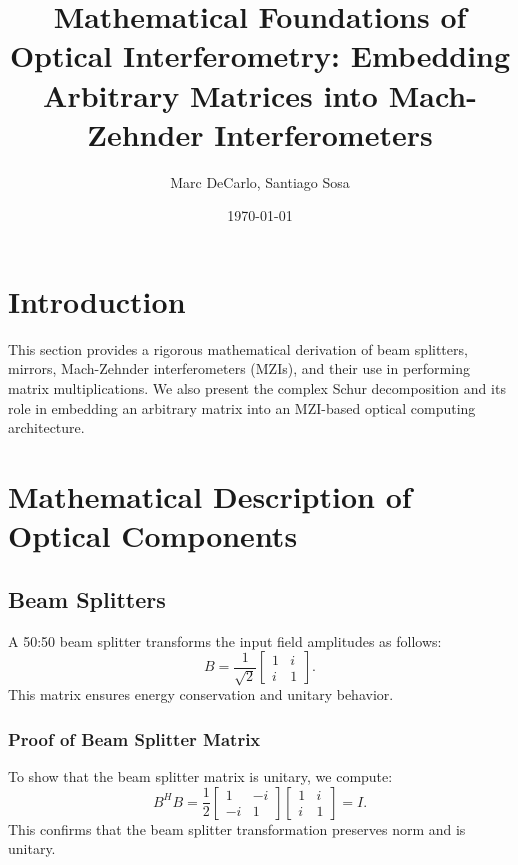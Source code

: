 \documentclass[a4paper,12pt]{article}
\begin{document}
\title{Mathematical Foundations of Optical Interferometry: Embedding Arbitrary Matrices into Mach-Zehnder Interferometers}
\author{Marc DeCarlo, Santiago Sosa}
\date{\today}
\maketitle

\tableofcontents

\section{Introduction}

This section provides a rigorous mathematical derivation of beam splitters, mirrors, Mach-Zehnder interferometers (MZIs), and their use in performing matrix multiplications. We also present the complex Schur decomposition and its role in embedding an arbitrary matrix into an MZI-based optical computing architecture.

\section{Mathematical Description of Optical Components}

\subsection{Beam Splitters}
A 50:50 beam splitter transforms the input field amplitudes as follows:
\begin{equation}
B = \frac{1}{\sqrt{2}} \begin{bmatrix} 1 & i \\ i & 1 \end{bmatrix}.
\end{equation}
This matrix ensures energy conservation and unitary behavior.

\subsubsection{Proof of Beam Splitter Matrix}
To show that the beam splitter matrix is unitary, we compute:
\begin{equation}
B^H B = \frac{1}{2} \begin{bmatrix} 1 & -i \\ -i & 1 \end{bmatrix} \begin{bmatrix} 1 & i \\ i & 1 \end{bmatrix} = I.
\end{equation}
This confirms that the beam splitter transformation preserves norm and is unitary.
\end{document}
